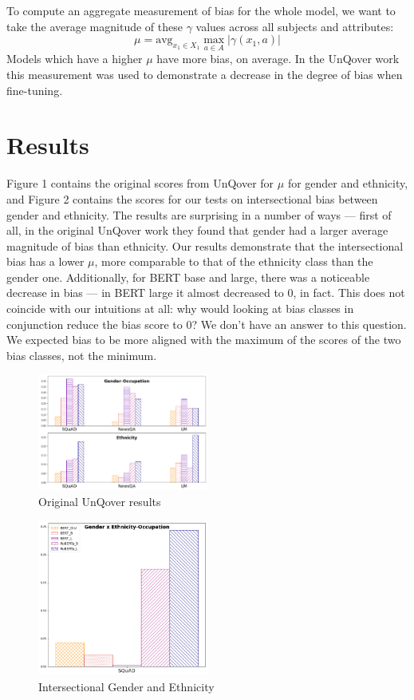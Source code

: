 \documentclass{article}
\newcommand{\avg}{\text{avg}}
\begin{document}
To compute an aggregate measurement of bias for the whole model, we want to take the average magnitude of these $\gamma$ values across all subjects and attributes:
\[
\mu = \avg_{x_1 \in X_1} \max_{a \in A} |\gamma(x_1, a)|
\]
Models which have a higher $\mu$ have more bias, on average. In the UnQover work this measurement was used to demonstrate a decrease in the degree of bias when fine-tuning.

\section{Results}

Figure 1 contains the original scores from UnQover for $\mu$ for gender and ethnicity, and Figure 2 contains the scores for our tests on intersectional bias between gender and ethnicity. The results are surprising in a number of ways --- first of all, in the original UnQover work they found that gender had a larger average magnitude of bias than ethnicity. Our results demonstrate that the intersectional bias has a lower $\mu$, more comparable to that of the ethnicity class than the gender one. Additionally, for BERT base and large, there was a noticeable decrease in bias --- in BERT large it almost decreased to $0$, in fact. This does not coincide with our intuitions at all: why would looking at bias classes in conjunction reduce the bias score to $0$? We don't have an answer to this question. We expected bias to be more aligned with the maximum of the scores of the two bias classes, not the minimum.

\begin{figure}[h]
  \centering
  \includegraphics[width=0.5\textwidth]{theirs}
  \caption{Original UnQover results}
\end{figure}
\begin{figure}[h]
  \centering
  \includegraphics[width=0.5\textwidth]{ours}
  \caption{Intersectional Gender and Ethnicity}
\end{figure}
\end{document}
